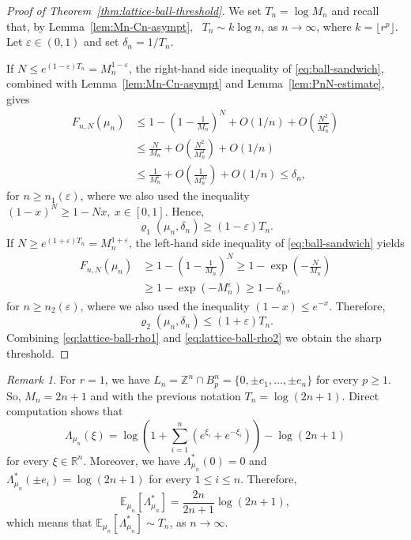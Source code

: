 \documentclass[11pt,a4paper]{article} %
\theoremstyle{definition}
\theoremstyle{remark}
\newtheorem{remark}[theorem]{Remark}
\newcommand{\1}{\mathds{1}}
\begin{document}
\begin{proof}[Proof of Theorem~\ref{thm:lattice-ball-threshold}]
    We set $T_n=\log M_n$ and recall that, by Lemma~\ref{lem:Mn-Cn-asympt}, \ $T_n \sim k \log n$, as $n \to \infty$, where $k=\lfloor r^p \rfloor$. Let $\varepsilon \in (0,1)$ and set $\delta_n=1/T_n$.

     If $N \leq e^{(1-\varepsilon)T_n}=M_n^{1-\varepsilon}$, the right-hand side inequality of \eqref{eq:ball-sandwich}, combined with Lemma~\ref{lem:Mn-Cn-asympt} and Lemma~\ref{lem:PnN-estimate}, gives \begin{align*}
        F_{n,N}(\mu_n) &\leq 1-\left(1-\frac{1}{M_n}\right)^N+O(1/n) + O\left( \frac{N^2}{M_n^2}\right)  
        \\ &\leq \frac{N}{M_n}+ O\left( \frac{N^2}{M_n^2}\right) +O(1/n) 
        \\ &\leq \frac{1}{M_n^\varepsilon}+ O\left(\frac{1}{M_n^{2\varepsilon}}\right)+O(1/n) \leq \delta_n,
    \end{align*}
    for $n \geq n_1(\varepsilon)$, where we also used the inequality  $(1-x)^N \geq 1-Nx, \ x \in [0,1]$. Hence, \begin{equation}\label{eq:lattice-ball-rho1}
    \varrho_1(\mu_n,\delta_n) \geq (1-\varepsilon)T_n.    
    \end{equation}
    If $N \geq e^{(1+\varepsilon)T_n}=M_n^{1+\varepsilon}$, the left-hand side inequality of \eqref{eq:ball-sandwich} yields \begin{align*}       
    F_{n,N}(\mu_n) &\geq 1-\left(1-\frac{1}{M_n}\right)^N \geq 1-\exp\left(-\frac{N}{M_n}\right)
    \\ &\geq 1-\exp\left(-M_n^\varepsilon\right) \geq 1-\delta_n,
    \end{align*}
    for $n \geq n_2(\varepsilon)$, where we also used the inequality $(1-x) \leq e^{-x}$. Therefore, \begin{equation}\label{eq:lattice-ball-rho2}
        \varrho_2(\mu_n,\delta_n) \leq (1+\varepsilon)T_n.
    \end{equation}
    Combining \eqref{eq:lattice-ball-rho1} and \eqref{eq:lattice-ball-rho2} we obtain the sharp threshold.   
\end{proof}



\begin{remark}\label{rem:lattice-ball}
    For $r=1$, we have $L_n=\mathbb{Z}^n \cap B_p^n=\{0,\pm e_1,\ldots,\pm e_n\}$ for every $p \geq 1$. So, $M_n=2n+1$ and with the previous notation $T_n=\log (2n+1).$ Direct computation shows that $$\Lambda_{\mu_n}(\xi)= \log \left(1+\sum_{i=1}^n (e^{\xi_i}+e^{-\xi_i})\right)-\log(2n+1)$$ for every $\xi \in \mathbb{R}^n$. Moreover, we have $\Lambda_{\mu_n}^\ast(0)=0$ and $\Lambda_{\mu_n}^\ast(\pm e_i)= \log(2n+1)$ for every $1 \leq i \leq n$. Therefore, $$\mathbb{E}_{\mu_n}[\Lambda_{\mu_n}^\ast]=\frac{2n}{2n+1}\log(2n+1),$$ which means that $\mathbb{E}_{\mu_n}[\Lambda_{\mu_n}^\ast]\sim T_n$, as $n \to \infty$.
\end{remark}
\end{document}
